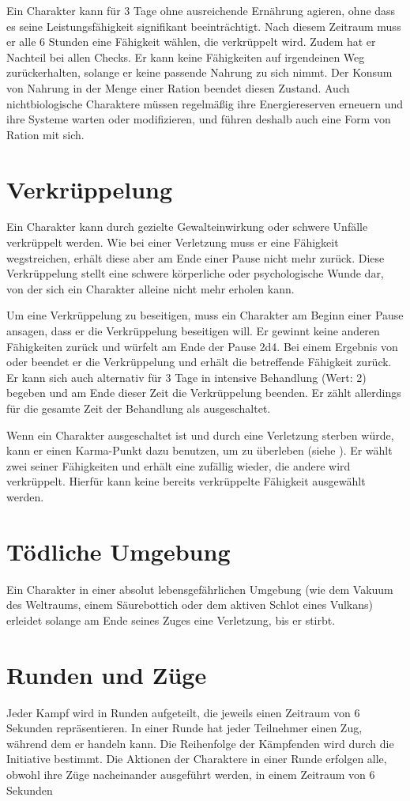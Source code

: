 Ein Charakter kann für 3 Tage ohne ausreichende Ernährung agieren, ohne dass es seine Leistungsfähigkeit signifikant beeinträchtigt. Nach diesem Zeitraum muss er alle 6 Stunden eine Fähigkeit wählen, die verkrüppelt wird. Zudem hat er Nachteil bei allen Checks. Er kann keine Fähigkeiten auf irgendeinen Weg zurückerhalten, solange er keine passende Nahrung zu sich nimmt. Der Konsum von Nahrung in der Menge einer Ration beendet diesen Zustand. Auch nichtbiologische Charaktere müssen regelmäßig ihre Energiereserven erneuern und ihre Systeme warten oder modifizieren, und führen deshalb auch eine Form von \glqq Ration\grqq{} mit sich.
\section{Verkrüppelung}
Ein Charakter kann durch gezielte Gewalteinwirkung oder schwere Unfälle verkrüppelt werden. Wie bei einer Verletzung muss er eine Fähigkeit wegstreichen, erhält diese aber am Ende einer Pause nicht mehr zurück. Diese Verkrüppelung stellt eine schwere körperliche oder psychologische Wunde dar, von der sich ein Charakter alleine nicht mehr erholen kann.

Um eine Verkrüppelung zu beseitigen, muss ein Charakter am Beginn einer Pause ansagen, dass er die Verkrüppelung beseitigen will. Er gewinnt keine anderen Fähigkeiten zurück und würfelt am Ende der Pause 2d4. Bei einem Ergebnis von \grqq{} oder \grqq{} beendet er die Verkrüppelung und erhält die betreffende Fähigkeit zurück. Er kann sich auch alternativ für 3 Tage in intensive Behandlung (Wert: 2) begeben und am Ende dieser Zeit die Verkrüppelung beenden. Er zählt allerdings für die gesamte Zeit der Behandlung als ausgeschaltet.

Wenn ein Charakter ausgeschaltet ist und durch eine Verletzung sterben würde, kann er einen Karma-Punkt dazu benutzen, um zu überleben (siehe ). Er wählt zwei seiner Fähigkeiten und erhält eine zufällig wieder, die andere wird verkrüppelt. Hierfür kann keine bereits verkrüppelte Fähigkeit ausgewählt werden.

\section{Tödliche Umgebung}
Ein Charakter in einer absolut lebensgefährlichen Umgebung (wie dem Vakuum des Weltraums, einem Säurebottich oder dem aktiven Schlot eines Vulkans) erleidet solange am Ende seines Zuges eine Verletzung, bis er stirbt.
\section{Runden und Züge}
Jeder Kampf wird in Runden aufgeteilt, die jeweils einen Zeitraum von 6 Sekunden repräsentieren. In einer Runde hat jeder Teilnehmer einen Zug, während dem er handeln kann. Die Reihenfolge der Kämpfenden wird durch die Initiative bestimmt. Die Aktionen der Charaktere in einer Runde erfolgen alle, obwohl ihre Züge nacheinander ausgeführt werden, in einem Zeitraum von 6 Sekunden

